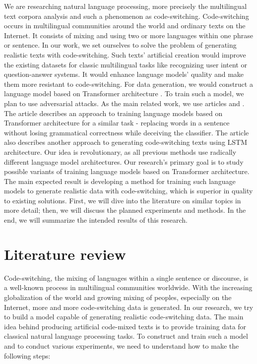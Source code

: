 \documentclass[conference]{IEEEtran}
\begin{document}
We are researching natural language processing, more precisely the multilingual text corpora analysis and such a phenomenon as code-switching. Code-switching occurs in multilingual communities around the world and ordinary texts on the Internet. It consists of mixing and using two or more languages within one phrase or sentence. In our work, we set ourselves to solve the problem of generating realistic texts with code-switching. Such texts' artificial creation would improve the existing datasets for classic multilingual tasks like recognizing user intent or question-answer systems. It would enhance language models' quality and make them more resistant to code-switching.
\newline\indent For data generation, we would construct a language model based on Transformer architecture \cite{transformer}. To train such a model, we plan to use adversarial attacks. As the main related work, we use articles \cite{dilma} and \cite{lstm}. The \cite{dilma} article describes an approach to training language models based on Transformer architecture for a similar task - replacing words in a sentence without losing grammatical correctness while deceiving the classifier. The \cite{lstm} article also describes another approach to generating code-switching texts using LSTM architecture. Our idea is revolutionary, as all previous methods use radically different language model architectures. Our research's primary goal is to study possible variants of training language models based on Transformer architecture. The main expected result is developing a method for training such language models to generate realistic data with code-switching, which is superior in quality to existing solutions. First, we will dive into the literature on similar topics in more detail; then, we will discuss the planned experiments and methods. In the end, we will summarize the intended results of this research.

\section{Literature review}

Code-switching, the mixing of languages within a single sentence or discourse, is a well-known process in multilingual communities worldwide. With the increasing globalization of the world and growing mixing of peoples, especially on the Internet, more and more code-switching data is generated. In our research, we try to build a model capable of generating realistic code-switching data. The main idea behind producing artificial code-mixed texts is to provide training data for classical natural language processing tasks. To construct and train such a model and to conduct various experiments, we need to understand how to make the following steps:
\end{document}
